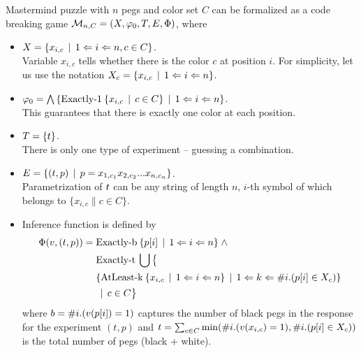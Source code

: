 
\begin{example}[Mastermind]
Mastermind puzzle with $n$ pegs and color set $C$ can be formalized as
a code breaking game
$\mathcal{M}_{n,C} = (X, \varphi_0, T, E, \Phi)$, where

\begin{itemize}
\item
$X = \{x_{i,c} \:\:|\:\: 1<=i<=n, c\in C\}$. \\
Variable $x_{i,c}$ tells whether there is the color $c$ at position $i$.
For simplicity, let us use the notation $X_c = \{ x_{i,c} \:\:|\:\: 1<=i<=n \}$.

\item
$\varphi_0 = \bigwedge\left\{
  \textrm{Exactly-1}\: \{x_{i,c} \:\:|\:\: c\in C\} \:\:|\:\: 1<=i<=n\right\}$. \\
This guarantees that there is exactly one color at each position.

\item $T = \{t\}$.\\
There is only one type of experiment -- guessing a combination.

\item $E = \{(t, p) \:\:|\:\: p = x_{1,c_1}x_{2,c_2}...x_{n,c_n}\}$.\\
Parametrization of $t$ can be any string of length $n$,
$i$-th symbol of which belongs to $\{ x_{i,c} \| c \in C\}$.

\item Inference function is defined by
\begin{align*}
\Phi(v, (t, p)) =\;
 & \textrm{Exactly-b}\:\{ p[i] \:\:|\:\: 1<=i<=n \} \;\wedge \\
 & \textrm{Exactly-t}\:\bigcup
      \big\{ \\
          & \{
                \textrm{AtLeast-k}\:\{ x_{i,c} \:\:|\:\: 1<=i<=n \}
                \:\:|\:\: 1 <= k <= \#i.(p[i]\in X_c)
            \} \\
            & \:\:|\:\: c\in C
      \big\}
\end{align*}
where $b = \# i . (v(p[i]) = 1)$ captures the number of black pegs
  in the response for the experiment $(t, p)$ and
  $t = \sum_{c\in C} \min( \#i.(v(x_{i,c}) = 1), \#i.(p[i]\in X_c))$
  is the total number of pegs (black + white).

\end{itemize}
\end{example}

